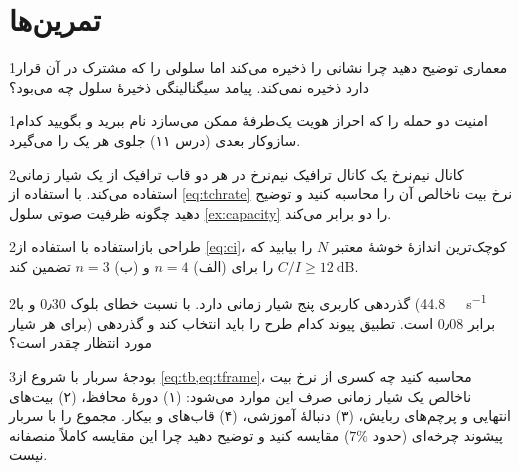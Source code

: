 \documentclass[11pt,a4paper]{article}
\begin{document}
\section{تمرین‌ها}\label{sec:exercises}

\begin{exercisebox}{1}{معماری}\label{exr:arch}
توضیح دهید چرا  نشانی  را ذخیره می‌کند اما سلولی را که مشترک در آن
قرار دارد ذخیره نمی‌کند. پیامد سیگنالینگی ذخیرهٔ سلول چه می‌بود؟
\end{exercisebox}

\begin{exercisebox}{1}{امنیت}\label{exr:sec}
دو حمله را که احراز هویت یک‌طرفهٔ  ممکن می‌سازد نام ببرید و بگویید کدام سازوکار
بعدی (درس ۱۱) جلوی هر یک را می‌گیرد.
\end{exercisebox}

\begin{exercisebox}{2}{کانال نیم‌نرخ}\label{exr:halfrate}
یک کانال ترافیک نیم‌نرخ در هر دو قاب ترافیک از یک شیار زمانی استفاده می‌کند. با استفاده
از \cref{eq:tchrate} نرخ بیت ناخالص آن را محاسبه کنید و توضیح دهید چگونه ظرفیت صوتی سلول
\cref{ex:capacity} را دو برابر می‌کند.
\end{exercisebox}

\begin{exercisebox}{2}{طراحی بازاستفاده}\label{exr:reuse}
با استفاده از \cref{eq:ci}، کوچک‌ترین اندازهٔ خوشهٔ معتبر $N$ را بیابید که
$C/I\ge\qty{12}{\dB}$ را برای (الف) $n=4$ و (ب) $n=3$ تضمین کند.
\end{exercisebox}

\begin{exercisebox}{2}{گذردهی }\label{exr:edge}
کاربری پنج شیار زمانی دارد. با  نسبت خطای بلوک 0٫30 و با 
(\qty{44.8}{\kilo\bit\per\second} برای هر شیار) برابر 0٫08 است. تطبیق پیوند کدام طرح را
باید انتخاب کند و گذردهی مورد انتظار چقدر است؟
\end{exercisebox}

\begin{exercisebox}{3}{بودجهٔ سربار}\label{exr:overhead}
با شروع از \cref{eq:tb,eq:tframe}، محاسبه کنید چه کسری از نرخ بیت ناخالص یک شیار زمانی
صرف این موارد می‌شود: (۱) دورهٔ محافظ، (۲) بیت‌های انتهایی و پرچم‌های ربایش، (۳) دنبالهٔ
آموزشی، (۴) قاب‌های  و بیکار. مجموع را با سربار پیشوند چرخه‌ای 
(حدود $7\%$) مقایسه کنید و توضیح دهید چرا این مقایسه کاملاً منصفانه نیست.
\end{exercisebox}
\end{document}
